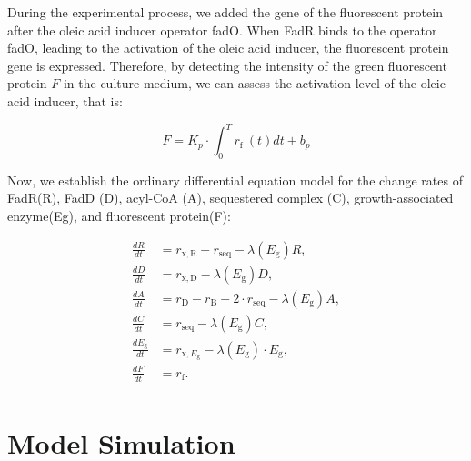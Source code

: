 \documentclass[UTF8]{article}
\begin{document}
During the experimental process, we added the gene of the fluorescent protein after the oleic acid inducer operator fadO. When FadR binds to the operator fadO, leading to the activation of the oleic acid inducer, the fluorescent protein gene is expressed. Therefore, by detecting the intensity of the green fluorescent protein $F$ in the culture medium, we can assess the activation level of the oleic acid inducer, that is:

\begin{equation}
	F = K_p \cdot \int_0^T r_{\text{f }}\left(t\right) d t+ b_p
\end{equation}

Now, we establish the ordinary differential equation model for the  change rates of FadR(R), FadD (D), acyl-CoA (A), sequestered complex  (C), growth-associated enzyme(Eg), and fluorescent protein(F):


\begin{equation}
\begin{aligned}
	\frac{d R}{d t} & =r_{\mathrm{x}, \mathrm{R}}-r_{\mathrm{seq}}-\lambda\left(E_{\mathrm{g}}\right) R, \\
	\frac{d D}{d t} & =r_{\mathrm{x}, \mathrm{D}}-\lambda\left(E_{\mathrm{g}}\right) D, \\
	\frac{d A}{d t} & =r_{\mathrm{D}}-r_{\mathrm{B}}-2 \cdot r_{\mathrm{seq}}-\lambda\left(E_{\mathrm{g}}\right) A, \\
	\frac{d C}{d t} & =r_{\mathrm{seq}}-\lambda\left(E_{\mathrm{g}}\right) C, \\
	\frac{d E_{\mathrm{g}}}{d t} & =r_{\mathrm{x}, E_{\mathrm{g}}}-\lambda\left(E_{\mathrm{g}}\right) \cdot E_{\mathrm{g}}, \\
	\frac{d F}{d t} & =r_{\mathrm{f}}.  \\
\end{aligned}
\end{equation}

\section{Model Simulation}
\end{document}
